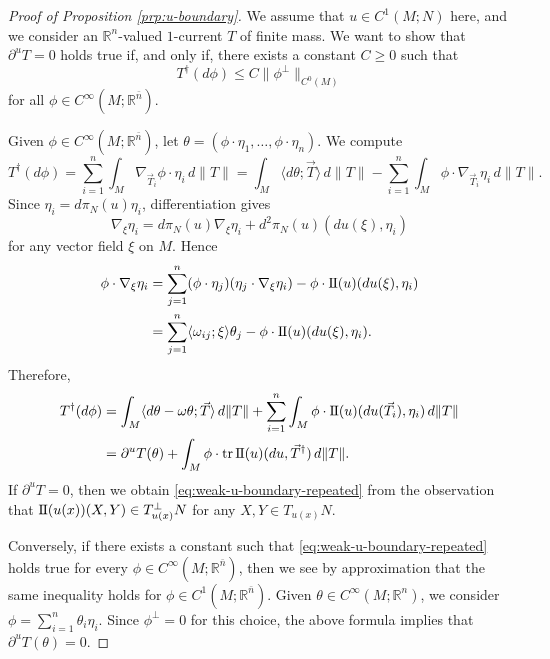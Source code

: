 \documentclass[10pt,a4paper]{amsart}
\newcommand{\R}{\mathbb{R}}
\newcommand{\ndim}{{\bar{n}}}
\newcommand{\sff}{\mathrm{I{\mkern -1mu}I}}
\DeclareMathOperator{\tr}{tr}
\newcommand{\pairing}[2]{\langle #1; #2 \rangle}
\begin{document}
\begin{proof}[Proof of Proposition \ref{prp:u-boundary}]
We assume that $u \in C^1(M; N)$ here, and we consider an $\R^n$-valued
$1$-current $T$ of finite mass. We want to show that $\partial^u T = 0$ holds true
if, and only if, there exists a constant $C \ge 0$ such that
\begin{equation} \label{eq:weak-u-boundary-repeated}
T^\dagger(d\phi) \le C\|\phi^\perp\|_{C^0(M)}
\end{equation}
for all $\phi \in C^\infty(M; \R^\ndim)$.

Given $\phi \in C^\infty(M; \R^\ndim)$, let $\theta = (\phi \cdot \eta_1, \dotsc, \phi \cdot \eta_n)$. We compute
\[
T^\dagger(d\phi) = \sum_{i = 1}^n \int_M \nabla_{\vec{T}_i} \phi \cdot \eta_i \, d\|T\| = \int_M \pairing{d\theta}{\vec{T}} \, d\|T\| - \sum_{i = 1}^n \int_M \phi \cdot \nabla_{\vec{T}_i} \eta_i \, d\|T\|.
\]
Since $\eta_i = d\pi_N(u) \eta_i$, differentiation gives
\[
\nabla_\xi \eta_i = d\pi_N(u) \nabla_\xi \eta_i + d^2\pi_N(u)(du(\xi), \eta_i)
\]
for any vector field $\xi$ on $M$. Hence
\[
\begin{split}
\phi \cdot \nabla_\xi \eta_i & = \sum_{j = 1}^n (\phi \cdot \eta_j) (\eta_j \cdot \nabla_\xi \eta_i) - \phi \cdot \sff(u)(du(\xi), \eta_i) \\
& = \sum_{j = 1}^n \pairing{\omega_{ij}}{\xi} \theta_j - \phi \cdot \sff(u)(du(\xi), \eta_i).
\end{split}
\]
Therefore,
\[
\begin{split}
T^\dagger(d\phi) & = \int_M \pairing{d\theta - \omega \theta}{\vec{T}} \, d\|T\| + \sum_{i = 1}^n \int_M \phi \cdot \sff(u)(du(\vec{T}_i), \eta_i) \, d\|T\| \\
& = \partial^u T(\theta) + \int_M \phi \cdot \tr \sff(u)(du, \vec{T}^\dagger) \, d\|T\|.
\end{split}
\]
If $\partial^u T = 0$, then we obtain \eqref{eq:weak-u-boundary-repeated} from the observation that $\sff(u(x))(X, Y) \in T_{u(x)}^\perp N$ for any $X, Y \in T_{u(x)} N$.

Conversely, if there exists a constant such that \eqref{eq:weak-u-boundary-repeated} holds true
for every $\phi \in C^\infty(M; \R^\ndim)$, then we see by approximation that the same inequality holds for $\phi \in C^1(M; \R^\ndim)$. Given $\theta \in C^\infty(M; \R^n)$, we consider $\phi = \sum_{i = 1}^n \theta_i \eta_i$.
Since $\phi^\perp = 0$ for this choice, the above formula implies that
$\partial^u T(\theta) = 0$.
\end{proof}
\end{document}
